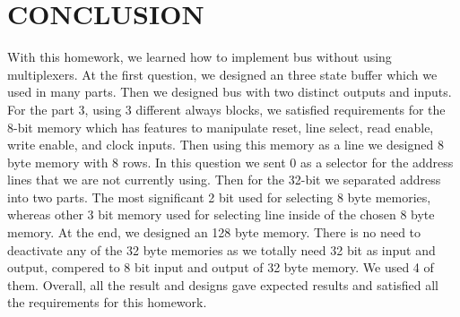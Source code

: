 \documentclass[pdftex,12pt,a4paper]{article}
\begin{document}
\section{CONCLUSION}
With this homework, we learned how to implement bus without using multiplexers.
At the first question, we designed an three state buffer which we used in many parts.
Then we designed bus with two distinct outputs and inputs.  For the part 3, using 3 different always blocks, we satisfied requirements for the 8-bit memory which has features to manipulate reset, line select, read enable, write enable, and clock inputs. Then using this memory as a line we designed 8 byte memory with 8 rows. In this question we sent 0 as a selector for the address lines that we are not currently using. Then for the 32-bit we separated address into two parts. The most significant 2 bit used for selecting 8 byte memories, whereas other 3 bit memory used for selecting line inside of the chosen 8 byte memory. At the end, we designed an 128 byte memory. There is no need to deactivate any of the 32 byte memories as we totally need 32 bit as input and output, compered to 8 bit input and output of 32 byte memory. We used 4 of them. Overall, all the result and designs gave expected results and satisfied all the requirements for this homework. 
\end{document}
